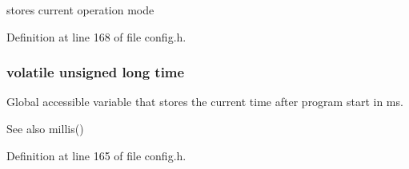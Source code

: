 stores current operation mode 



Definition at line 168 of file config.\+h.

\subsubsection[{\texorpdfstring{time}{time}}]{\setlength{\rightskip}{0pt plus 5cm}volatile unsigned long time\hspace{0.3cm}{\ttfamily [static]}}\hypertarget{group__main_ga4f944bfefd58754546ebcc7c5143442c}{}\label{group__main_ga4f944bfefd58754546ebcc7c5143442c}


Global accessible variable that stores the current time after program start in ms. 

\begin{DoxySeeAlso}{See also}
millis() 
\end{DoxySeeAlso}


Definition at line 165 of file config.\+h.

